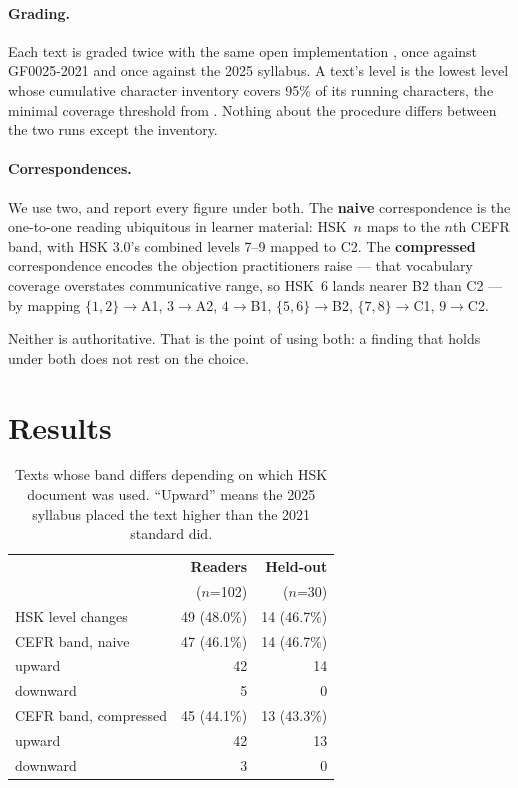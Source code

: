 \documentclass[11pt]{article}
\begin{document}
\paragraph{Grading.} Each text is graded twice with the same open
implementation \citep{serrano2026whichhsk}, once against GF0025-2021 and once
against the 2025 syllabus. A text's level is the lowest level whose cumulative
character inventory covers 95\% of its running characters, the minimal coverage
threshold from \citet{laufer2010lexical}. Nothing about the procedure differs
between the two runs except the inventory.

\paragraph{Correspondences.} We use two, and report every figure under both.
The \textbf{naive} correspondence is the one-to-one reading ubiquitous in
learner material: HSK~$n$ maps to the $n$th CEFR band, with HSK 3.0's combined
levels 7--9 mapped to C2. The \textbf{compressed} correspondence encodes the
objection practitioners raise --- that vocabulary coverage overstates
communicative range, so HSK~6 lands nearer B2 than C2 --- by mapping
$\{1,2\}\!\to\!$A1, $3\!\to\!$A2, $4\!\to\!$B1, $\{5,6\}\!\to\!$B2,
$\{7,8\}\!\to\!$C1, $9\!\to\!$C2.

Neither is authoritative. That is the point of using both: a finding that holds
under both does not rest on the choice.

\section{Results}

\begin{table}[t]
\centering
\small
\begin{tabular}{lrr}
\toprule
& \textbf{Readers} & \textbf{Held-out} \\
& ($n$=102) & ($n$=30) \\
\midrule
HSK level changes        & 49 (48.0\%) & 14 (46.7\%) \\
\addlinespace
CEFR band, naive         & 47 (46.1\%) & 14 (46.7\%) \\
\quad upward             & 42          & 14 \\
\quad downward           & 5           & 0 \\
\addlinespace
CEFR band, compressed    & 45 (44.1\%) & 13 (43.3\%) \\
\quad upward             & 42          & 13 \\
\quad downward           & 3           & 0 \\
\bottomrule
\end{tabular}
\caption{Texts whose band differs depending on which HSK document was used.
``Upward'' means the 2025 syllabus placed the text higher than the 2021
standard did.}
\label{tab:main}
\end{table}
\end{document}
